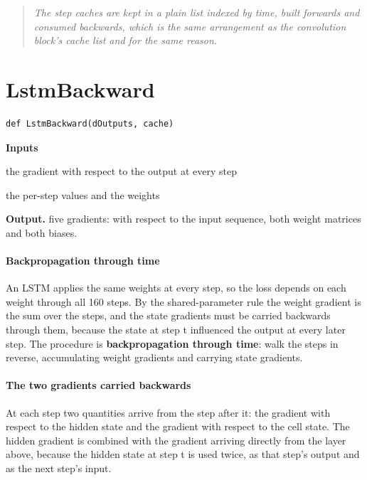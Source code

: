 \begin{quote}\small\itshape The step caches are kept in a plain list indexed by time, built forwards and consumed backwards, which is the same arrangement as the convolution block's cache list and for the same reason.\end{quote}

\section{LstmBackward}
\begin{lstlisting}[style=sig]
def LstmBackward(dOutputs, cache)
\end{lstlisting}

\noindent\textbf{Inputs}
\begin{description}[leftmargin=2.2em,style=nextline,font=\normalfont\ttfamily]\setlength\itemsep{1pt}
  \item[{dOutputs}] \normalfont the gradient with respect to the output at every step
  \item[{cache}] \normalfont the per-step values and the weights
\end{description}

\noindent\textbf{Output.} five gradients: with respect to the input sequence, both weight matrices and both biases.


\paragraph{Backpropagation through time}
An LSTM applies the same weights at every step, so the loss depends on each weight through all 160 steps. By the shared-parameter rule the weight gradient is the sum over the steps, and the state gradients must be carried backwards through them, because the state at step t influenced the output at every later step. The procedure is \textbf{backpropagation through time}: walk the steps in reverse, accumulating weight gradients and carrying state gradients.


\paragraph{The two gradients carried backwards}
At each step two quantities arrive from the step after it: the gradient with respect to the hidden state and the gradient with respect to the cell state. The hidden gradient is combined with the gradient arriving directly from the layer above, because the hidden state at step t is used twice, as that step's output and as the next step's input.


